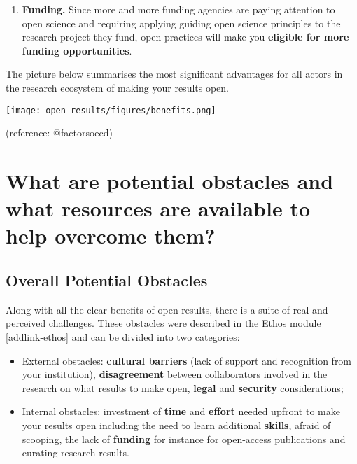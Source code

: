 \documentclass[
  letterpaper,
  DIV=11,
  numbers=noendperiod]{scrreport}
\providecommand{\tightlist}{%
  \setlength{\itemsep}{0pt}\setlength{\parskip}{0pt}}\usepackage{longtable,booktabs,array}
\begin{document}
\begin{enumerate}
\def\labelenumi{\arabic{enumi}.}
\tightlist
\item
  \textbf{Funding.} Since more and more funding agencies are paying
  attention to open science and requiring applying guiding open science
  principles to the research project they fund, open practices will make
  you \textbf{eligible for more funding opportunities}.
\end{enumerate}

The picture below summarises the most significant advantages for all
actors in the research ecosystem of making your results open.

\texttt{[image: open-results/figures/benefits.png]}

(reference: @factorsoecd)

\hypertarget{what-are-potential-obstacles-and-what-resources-are-available-to-help-overcome-them}{%
\section{What are potential obstacles and what resources are available
to help overcome
them?}\label{what-are-potential-obstacles-and-what-resources-are-available-to-help-overcome-them}}

\hypertarget{overall-potential-obstacles}{%
\subsection{Overall Potential
Obstacles}\label{overall-potential-obstacles}}

Along with all the clear benefits of open results, there is a suite of
real and perceived challenges. These obstacles were described in the
Ethos module {[}addlink-ethos{]} and can be divided into two categories:

\begin{itemize}
\tightlist
\item
  External obstacles: \textbf{cultural barriers} (lack of support and
  recognition from your institution), \textbf{disagreement} between
  collaborators involved in the research on what results to make open,
  \textbf{legal} and \textbf{security} considerations;
\item
  Internal obstacles: investment of \textbf{time} and \textbf{effort}
  needed upfront to make your results open including the need to learn
  additional \textbf{skills}, afraid of scooping, the lack of
  \textbf{funding} for instance for open-access publications and
  curating research results.
\end{itemize}
\end{document}
